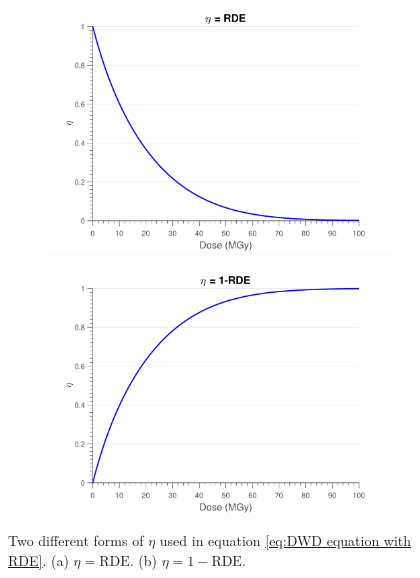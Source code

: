\begin{figure}
        \centering
        \begin{subfigure}[b]{0.45\textwidth}
                \centering
                \includegraphics[width=\textwidth]{figures/dwd/EtaDecreasing.pdf}
                \caption{}
                \label{fig:Decreasing Eta}
        \end{subfigure}
			\quad
        \begin{subfigure}[b]{0.45\textwidth}
                \centering
                \includegraphics[width=\textwidth]{figures/dwd/EtaIncreasing.pdf}
                \caption{}
                \label{fig:Increasing Eta}
        \end{subfigure}
        \caption{Two different forms of $\eta$ used in equation \ref{eq:DWD equation with RDE}. (a) $\eta = \text{RDE}$. (b) $\eta = 1-\text{RDE}$.}
        \label{fig:Different Eta forms}
\end{figure}

